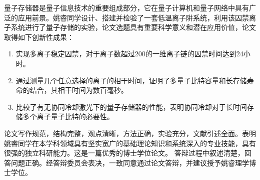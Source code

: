 
\begin{resolution}

  量子存储器是量子信息技术的重要组成部分，它在量子计算机和量子网络中具有广泛的应用前景。姚睿同学设计、搭建并检验了一套低温离子阱系统，利用该囚禁离子系统进行了量子存储的实验，论文选题具有重要科学意义和潜在应用价值，论文取得如下创新性成果： 

  \begin{enumerate}
    \item 实现多离子稳定囚禁，对于离子数超过200的一维离子链的囚禁时间达到24小时。
    \item 通过测量几个任意选择的离子的相干时间，证明了多量子比特容量和长存储寿命的结合，其相干时间为数百毫秒。
    \item 比较了有无协同冷却激光下的量子存储器的性能，表明协同冷却对于长时间存储多个离子量子比特的必要性。
  \end{enumerate}


  论文写作规范，结构完整，观点清晰，方法正确，实验充分，文献引述全面。表明姚睿同学在本学科领域具有坚实宽广的基础理论知识和系统深入的专业技能，具有很强的独立科研能力。这是一篇优秀的博士学位论文。
  答辩过程中叙述清楚，回答问题正确。经答辩委员会表决，一致同意通过论文答辩，并建议授予姚睿理学博士学位。



\end{resolution}
